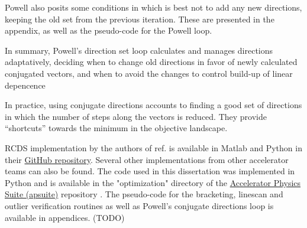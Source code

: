 Powell also posits some conditions in which is best not to add any new directions, keeping the old set from the previous iteration. These are presented in the appendix, as well as the pseudo-code for the Powell loop.

In summary, Powell's direction set loop calculates and manages directions adaptatively, deciding when to change old directions in favor of newly calculated conjugated vectors, and when to avoid the changes to control build-up of linear depencence

In practice, using conjugate directions accounts to finding a good set of directions in which the number of steps along the vectors is reduced. They provide ``shortcuts'' towards the minimum in the objective landscape.

RCDS implementation by the authors of ref.\cite{huang_algorithm_2013} is available in Matlab and Python in their \href{https://github.com/SPEAR3-ML/RCDS}{GitHub repository}. Several other implementations from other accelerator teams can also be found. The code used in this dissertation was implemented in Python and is available in the "optimization" directory of the \href{https://github.com/lnls-fac/apsuite}{Accelerator Physics Suite (apsuite)} repository \cite{apsuite}. The pseudo-code for the bracketing, linescan and outlier verification routines as well as Powell's conjugate directions loop is available in appendices. (TODO)
